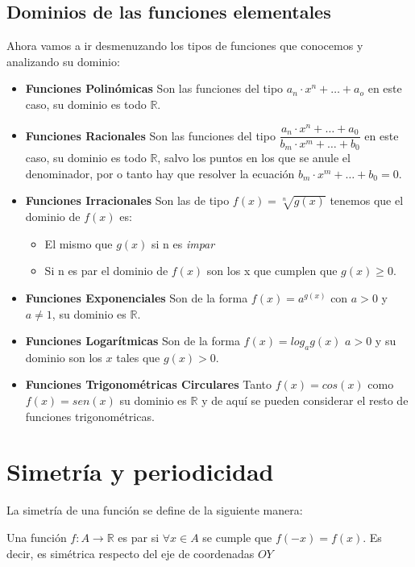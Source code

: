 \subsection*{Dominios de las funciones elementales}
\noindent
Ahora vamos a ir desmenuzando los tipos de funciones que conocemos y analizando su dominio:
\begin{itemize}
\item \textbf{Funciones Polinómicas} Son las funciones del tipo $a_n\cdot x^n+\ldots+ a_o$ en este caso, su dominio es todo $\mathbb{R}$.
\item \textbf{Funciones Racionales} Son las funciones del tipo $\displaystyle \dfrac{a_n\cdot x^n+\ldots+ a_0}{b_m\cdot x^m+\ldots+ b_0}$ en este caso, su dominio es todo $\mathbb{R}$, salvo los puntos en los que se anule el denominador, por o tanto hay que resolver la ecuación $b_m\cdot x^m+\ldots+ b_0=0$.
\item \textbf{Funciones Irracionales} Son las de tipo $f(x)=\sqrt[n]{g(x)}$ tenemos que el dominio de $f(x)$ es:
\begin{itemize}
\item El mismo que $g(x)$ si n es \emph{impar}
\item Si n es par el dominio de $f(x)$ son los x que cumplen que  $g(x)\geq 0$. 
\end{itemize}
\item \textbf{Funciones Exponenciales}
Son de la forma $f(x)=a^{g(x)}$ con $a>0$ y $a\neq 1$, su dominio es $\mathbb{R}$.
\item \textbf{Funciones Logarítmicas}
Son de la forma $f(x)=log_a g(x)$ $a>0$ y  su dominio son los $x$ tales que $g(x)>0$.
\item \textbf{Funciones Trigonométricas Circulares} 
Tanto $f(x)=cos(x)$ como $f(x)=sen(x)$ su dominio es $\mathbb{R}$ y de aquí se pueden considerar el resto de funciones trigonométricas. 
\end{itemize}
\section{Simetría y periodicidad}
\noindent
La simetría de una función se define de la siguiente manera:

\begin{defi}
Una función $f:A \longrightarrow \mathbb{R}$ es par si $\forall x \in A$ se cumple que $f(-x)=f(x)$. Es decir, es simétrica respecto del eje de coordenadas $OY$
\end{defi}

